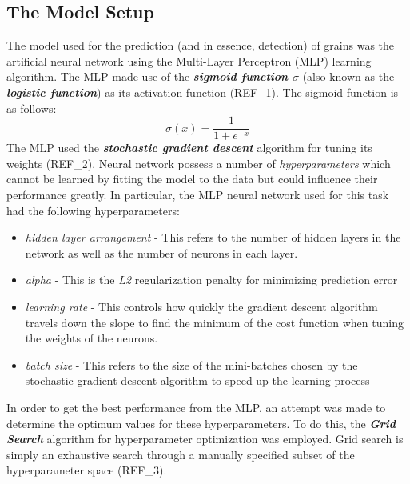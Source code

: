 \subsection{The Model Setup}
The model used for the prediction (and in essence, detection) of grains was the artificial neural network using the Multi-Layer Perceptron (MLP) learning algorithm. The MLP made use of the \textit{\textbf{sigmoid function $\sigma$}} (also known as the \textbf{\textit{logistic function}}) as its activation function (REF\_1). The sigmoid function is as follows:
\begin{equation}
\sigma(x) = \frac{1}{1 + e^{-x}}
\end{equation}
The MLP used the \textit{\textbf{stochastic gradient descent}} algorithm for tuning its weights (REF\_2). Neural network possess a number of \textit{hyperparameters} which cannot be learned by fitting the model to the data but could influence their performance greatly. In particular, the MLP neural network used for this task had the following hyperparameters:
\begin{itemize}
\item \textit{hidden layer arrangement} - This refers to the number of hidden layers in the network as well as the number of neurons in each layer.
\item \textit{alpha} - This is the \textit{L2} regularization penalty for minimizing prediction error
\item \textit{learning rate} - This controls how quickly the gradient descent algorithm travels down the slope to find the minimum of the cost function when tuning the weights of the neurons.
\item \textit{batch size} - This refers to the size of the mini-batches chosen by the stochastic gradient descent algorithm to speed up the learning process
\end{itemize}
In order to get the best performance from the MLP, an attempt was made to determine the optimum values for these hyperparameters. To do this, the \textit{\textbf{Grid Search}} algorithm for hyperparameter optimization was employed. Grid search is simply an exhaustive search through a manually specified subset of the hyperparameter space (REF\_3).

